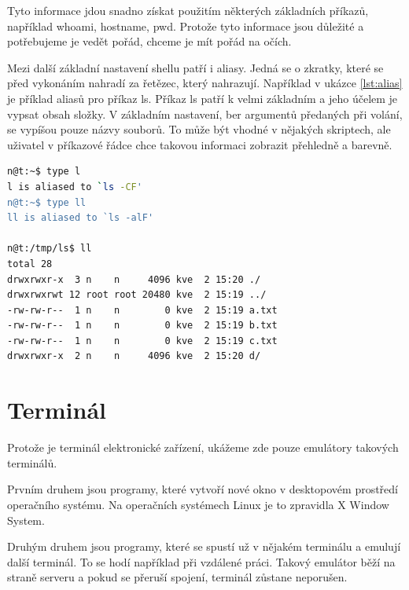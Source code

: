 \documentclass[thesis=M,czech]{FITthesis}[2012/06/26]
\begin{document}
Tyto informace jdou snadno získat použitím některých základních příkazů, například whoami, hostname, pwd. Protože tyto informace jsou důležité a potřebujeme je vedět pořád, chceme je mít pořád na očích.

Mezi další základní nastavení shellu patří i aliasy. Jedná se o zkratky, které se před vykonáním nahradí za řetězec, který nahrazují. Například v ukázce \ref{lst:alias} je příklad aliasů pro příkaz ls. Příkaz ls patří k velmi základním a jeho účelem je vypsat obsah složky. V základním nastavení, ber argumentů předaných při volání, se vypíšou pouze názvy souborů. To může být vhodné v nějakých skriptech, ale uživatel v příkazové řádce chce takovou informaci zobrazit přehledně a barevně.

\begin{minipage}{\linewidth}
\begin{lstlisting}[language=bash, caption={Příklad použití aliasu v Bashi}, label={lst:alias}]
n@t:~$ type l
l is aliased to `ls -CF'
n@t:~$ type ll
ll is aliased to `ls -alF'

n@t:/tmp/ls$ ll
total 28
drwxrwxr-x  3 n    n     4096 kve  2 15:20 ./
drwxrwxrwt 12 root root 20480 kve  2 15:19 ../
-rw-rw-r--  1 n    n        0 kve  2 15:19 a.txt
-rw-rw-r--  1 n    n        0 kve  2 15:19 b.txt
-rw-rw-r--  1 n    n        0 kve  2 15:19 c.txt
drwxrwxr-x  2 n    n     4096 kve  2 15:20 d/
\end{lstlisting}
\end{minipage}

%
%
%
\section{Terminál}


Protože je terminál elektronické zařízení, ukážeme zde pouze emulátory takových terminálů.

Prvním druhem jsou programy, které vytvoří nové okno v desktopovém prostředí operačního systému. Na operačních systémech Linux je to zpravidla X Window System.

Druhým druhem jsou programy, které se spustí už v nějakém terminálu a emulují další terminál. To se hodí například při vzdálené práci. Takový emulátor běží na straně serveru a pokud se přeruší spojení, terminál zůstane neporušen.
\end{document}
